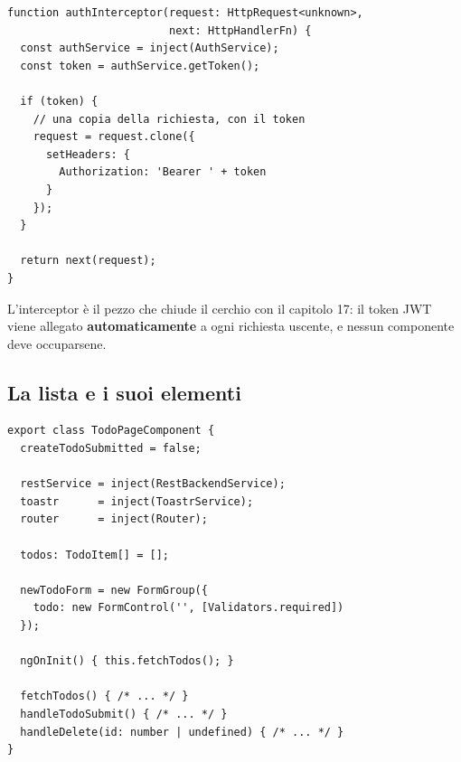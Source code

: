 \begin{affianco}[0.5][c]
\codicepiccolo
\begin{lstlisting}[style=ts, name=auth.interceptor.ts]
function authInterceptor(request: HttpRequest<unknown>,
                         next: HttpHandlerFn) {
  const authService = inject(AuthService);
  const token = authService.getToken();

  if (token) {
    // una copia della richiesta, con il token
    request = request.clone({
      setHeaders: {
        Authorization: 'Bearer ' + token
      }
    });
  }

  return next(request);
}
\end{lstlisting}
\risultato
\begin{immagine}
\end{immagine}
\end{affianco}

L'interceptor è il pezzo che chiude il cerchio con il capitolo 17: il token JWT
viene allegato \textbf{automaticamente} a ogni richiesta uscente, e nessun
componente deve occuparsene.

\subsection{La lista e i suoi elementi}

\begin{lstlisting}[style=ts, name=todo-page.component.ts]
export class TodoPageComponent {
  createTodoSubmitted = false;

  restService = inject(RestBackendService);
  toastr      = inject(ToastrService);
  router      = inject(Router);

  todos: TodoItem[] = [];

  newTodoForm = new FormGroup({
    todo: new FormControl('', [Validators.required])
  });

  ngOnInit() { this.fetchTodos(); }

  fetchTodos() { /* ... */ }
  handleTodoSubmit() { /* ... */ }
  handleDelete(id: number | undefined) { /* ... */ }
}
\end{lstlisting}

